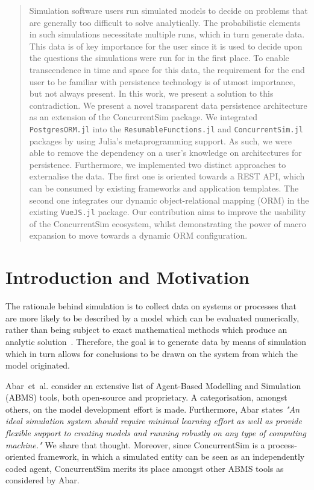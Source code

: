 \documentclass{juliacon}
\begin{document}

\maketitle

\begin{abstract}
Simulation software users run simulated models to decide on problems that are generally too difficult to solve analytically. The probabilistic elements in such simulations necessitate multiple runs, which in turn generate data. This data is of key importance for the user since it is used to decide upon the questions the simulations were run for in the first place. To enable transcendence in time and space for this data, the requirement for the end user to be familiar with persistence technology is of utmost importance, but not always present. In this work, we present a solution to this contradiction. We present a novel transparent data persistence architecture as an extension of the ConcurrentSim package. We integrated \texttt{PostgresORM.jl} into the \texttt{ResumableFunctions.jl} and \texttt{ConcurrentSim.jl} packages by using Julia's metaprogramming support. As such, we were able to remove the dependency on a user's knowledge on architectures for persistence. Furthermore, we implemented two distinct approaches to externalise the data. The first one is oriented towards a REST API, which can be consumed by existing frameworks and application templates. The second one integrates our dynamic object-relational mapping (ORM) in the existing \texttt{VueJS.jl} package.  Our contribution aims to improve the usability of the \mbox{ConcurrentSim} ecosystem, whilst demonstrating the power of macro expansion to move towards a dynamic ORM configuration.
\end{abstract}

\section{Introduction and Motivation}\label{Intro}

The rationale behind simulation is to collect data on systems or processes that are more likely to be described by a model which can be evaluated numerically, rather than being subject to exact mathematical methods which produce an analytic solution~\cite{law2007simulation}. Therefore, the goal is to generate data by means of simulation which in turn allows for conclusions to be drawn on the system from which the model originated.\vskip 6pt

Abar~et~al. \cite{abar2017agent} consider an extensive list of Agent-Based Modelling and Simulation (ABMS) tools, both open-source and proprietary. A categorisation, amongst others, on the model development effort is made. Furthermore, Abar states \textit{"An ideal simulation system should require minimal learning effort as well as provide flexible support to creating models and running robustly on any type of computing machine."} We share that thought. Moreover, since ConcurrentSim  is a process-oriented framework, in which a simulated entity can be seen as an independently coded agent, ConcurrentSim  merits its place amongst other ABMS tools as considered by Abar. \vskip 6pt
\end{document}
